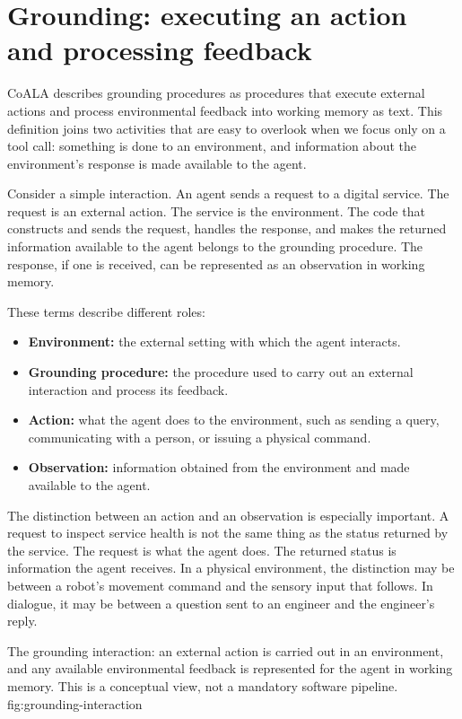 \section{Grounding: executing an action and processing feedback}
\label{sec:grounding-procedure}

CoALA describes grounding procedures as procedures that execute external actions and process environmental feedback into working memory as text. This definition joins two activities that are easy to overlook when we focus only on a tool call: something is done to an environment, and information about the environment's response is made available to the agent.

Consider a simple interaction. An agent sends a request to a digital service. The request is an external action. The service is the environment. The code that constructs and sends the request, handles the response, and makes the returned information available to the agent belongs to the grounding procedure. The response, if one is received, can be represented as an \gls{observation} in working memory.

These terms describe different roles:

\begin{itemize}
  \item \textbf{Environment:} the external setting with which the agent interacts.
  \item \textbf{Grounding procedure:} the procedure used to carry out an external interaction and process its feedback.
  \item \textbf{Action:} what the agent does to the environment, such as sending a query, communicating with a person, or issuing a physical command.
  \item \textbf{Observation:} information obtained from the environment and made available to the agent.
\end{itemize}

The distinction between an action and an observation is especially important. A request to inspect service health is not the same thing as the status returned by the service. The request is what the agent does. The returned status is information the agent receives. In a physical environment, the distinction may be between a robot's movement command and the sensory input that follows. In dialogue, it may be between a question sent to an engineer and the engineer's reply.

  {The grounding interaction: an external action is carried out in an environment, and any available environmental feedback is represented for the agent in working memory. This is a conceptual view, not a mandatory software pipeline.}
  {fig:grounding-interaction}

